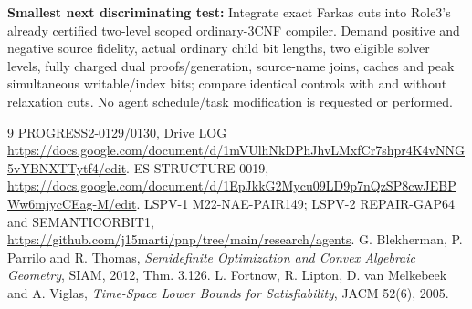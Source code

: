 \documentclass[11pt]{article}
\begin{document}
\textbf{Smallest next discriminating test:} Integrate exact Farkas cuts into Role3's already certified two-level scoped ordinary-3CNF compiler. Demand positive and negative source fidelity, actual ordinary child bit lengths, two eligible solver levels, fully charged dual proofs/generation, source-name joins, caches and peak simultaneous writable/index bits; compare identical controls with and without relaxation cuts. No agent schedule/task modification is requested or performed.

\begin{thebibliography}{9}
 PROGRESS2-0129/0130, Drive LOG \url{https://docs.google.com/document/d/1mVUlhNkDPhJhvLMxfCr7shpr4K4vNNG5vYBNXTTytf4/edit}.
 ES-STRUCTURE-0019, \url{https://docs.google.com/document/d/1EpJkkG2Mycu09LD9p7nQzSP8cwJEBPWw6mjycCEag-M/edit}.
 LSPV-1 M22-NAE-PAIR149; LSPV-2 REPAIR-GAP64 and SEMANTICORBIT1, \url{https://github.com/j15marti/pnp/tree/main/research/agents}.
 G. Blekherman, P. Parrilo and R. Thomas, \emph{Semidefinite Optimization and Convex Algebraic Geometry}, SIAM, 2012, Thm. 3.126.
 L. Fortnow, R. Lipton, D. van Melkebeek and A. Viglas, \emph{Time-Space Lower Bounds for Satisfiability}, JACM 52(6), 2005.
\end{thebibliography}
\end{document}
